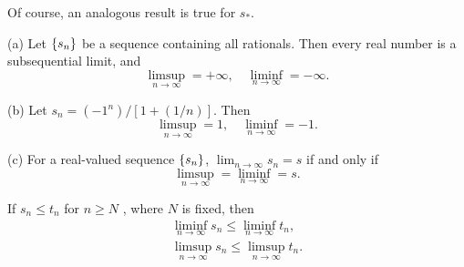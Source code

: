 Of course, an analogous result is true for $s_*$.

\begin{newexample}    
(a) Let $\protect\{s_n\}$  be a sequence containing all rationals. Then every real number is a subsequential limit, and
\begin{equation*}
    \limsup_{n\rightarrow\infty} = +\infty,\quad
    \liminf_{n\rightarrow\infty} = -\infty.
\end{equation*}

(b) Let $s_n=(-1^n)/[1 + (1/n)]$. Then
\begin{equation*}
    \limsup_{n\rightarrow\infty} = 1,\quad
    \liminf_{n\rightarrow\infty} = -1.
\end{equation*}

(c) For a real-valued sequence $\protect\{s_n\}$, $\lim_{n \to \infty} s_n = s$ if and only if
\begin{equation*}
    \limsup_{n\rightarrow\infty} = 
    \liminf_{n\rightarrow\infty} = s.
\end{equation*}
\end{newexample}

\begin{thm}
    \label{thm:3.19}
    If $s_n \leq t_n$ for $n \geq N$ , where $N$ is fixed, then
    \begin{align*}
        \liminf_{n \rightarrow \infty} s_n \leq \liminf_{n \rightarrow \infty} t_n,\\
        \limsup_{n \rightarrow \infty} s_n \leq \limsup_{n \rightarrow \infty} t_n.
    \end{align*}
\end{thm}